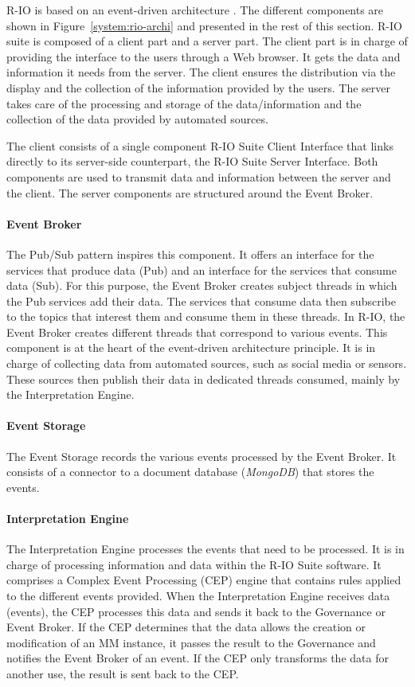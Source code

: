 R-IO is based on an event-driven architecture \parencite{benabenConceptualFrameworkSuite2017}.
The different components are shown in Figure~\ref{system:rio-archi} and presented in the rest of this section.
R-IO suite is composed of a client part and a server part.
The client part is in charge of providing the interface to the users through a Web browser.
It gets the data and information it needs from the server.
The client ensures the distribution via the display and the collection of the information provided by the users.
The server takes care of the processing and storage of the data/information and the collection of the data provided by automated sources.

The client consists of a single component R-IO Suite Client Interface that links directly to its server-side counterpart, the R-IO Suite Server Interface.
Both components are used to transmit data and information between the server and the client.
The server components are structured around the Event Broker.
\paragraph{Event Broker}
The Pub/Sub pattern inspires this component.
It offers an interface for the services that produce data (Pub) and an interface for the services that consume data (Sub).
For this purpose, the Event Broker creates subject threads in which the Pub services add their data.
The services that consume data then subscribe to the topics that interest them and consume them in these threads.
In R-IO, the Event Broker creates different threads that correspond to various events.
This component is at the heart of the event-driven architecture principle.
It is in charge of collecting data from automated sources, such as social media or sensors.
These sources then publish their data in dedicated threads consumed, mainly by the Interpretation Engine.
\paragraph{Event Storage}
The Event Storage records the various events processed by the Event Broker.
It consists of a connector to a document database (\textit{MongoDB}) that stores the events.
\paragraph{Interpretation Engine}
The Interpretation Engine processes the events that need to be processed.
It is in charge of processing information and data within the R-IO Suite software.
It comprises a Complex Event Processing (CEP) engine that contains rules applied to the different events provided.
When the Interpretation Engine receives data (events), the CEP processes this data and sends it back to the Governance or Event Broker.
If the CEP determines that the data allows the creation or modification of an MM instance, it passes the result to the Governance and notifies the Event Broker of an event.
If the CEP only transforms the data for another use, the result is sent back to the CEP.

